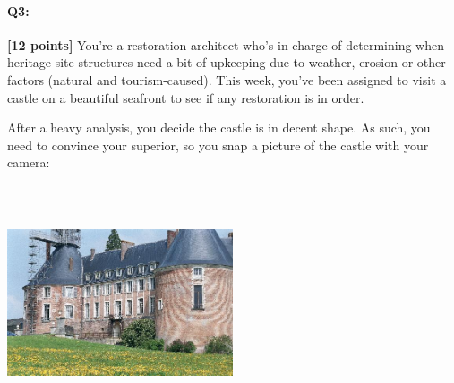 \documentclass[11pt]{article}
\begin{document}

\pagebreak

\paragraph{Q3:} \textbf{[12 points]} You're a restoration architect who's in charge of determining when heritage site structures need a bit of upkeeping due to weather, erosion or other factors (natural and tourism-caused). This week, you've been assigned to visit a castle on a beautiful seafront to see if any restoration is in order.

After a heavy analysis, you decide the castle is in decent shape. As such, you need to convince your superior, so you snap a picture of the castle with your camera:

\includegraphics[width=0.5\textwidth,height=7cm,keepaspectratio]{images/castle.jpg}


\end{document}
